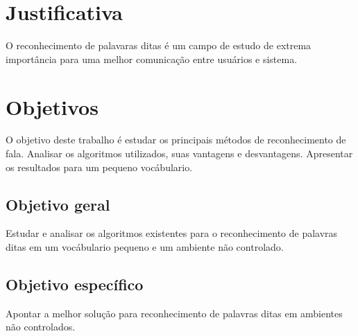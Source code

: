 \section{Justificativa}
\label{sec:justificativa}



O reconhecimento de palavaras ditas é um campo de estudo de extrema importância para uma melhor comunicação entre usuários e sistema.
\section{Objetivos}
\label{sec:objetivos}

O objetivo deste trabalho é estudar os principais métodos de reconhecimento de fala. Analisar os algoritmos utilizados, suas vantagens e desvantagens. Apresentar os resultados para um pequeno vocábulario.
\subsection{Objetivo geral}
\label{subsec:objetivogeral}
Estudar e analisar os algoritmos existentes para o reconhecimento de palavras  ditas em um vocábulario pequeno e um ambiente não controlado.
\subsection{Objetivo específico}
\label{subsec:objetivoespecifico}
Apontar a melhor solução para reconhecimento de palavras ditas em ambientes não controlados.


